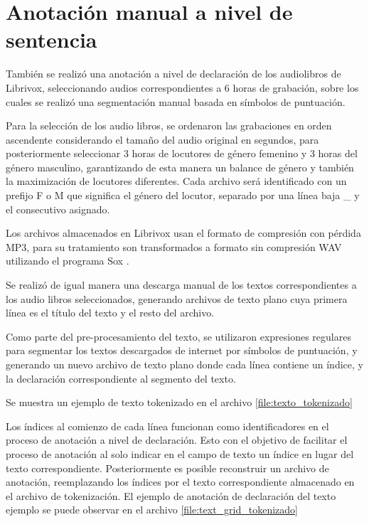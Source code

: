 \documentclass[a4paper,12pt,twoside]{report}
\begin{document}




\section{Anotación manual a nivel de sentencia}

También se realizó una anotación a nivel de declaración de los audiolibros de Librivox, seleccionando audios correspondientes a 6 horas de grabación, sobre los cuales se realizó una segmentación manual basada en símbolos de puntuación.

Para la selección de los audio libros, se ordenaron las grabaciones en orden ascendente considerando el tamaño del audio original en segundos, para posteriormente seleccionar 3 horas de locutores de género femenino y 3 horas del género masculino, garantizando de esta manera un balance de género y también la maximización de locutores diferentes. Cada archivo será identificado con un prefijo F o M que significa el género del locutor, separado por una línea baja \_ y el consecutivo asignado.

Los archivos almacenados en Librivox usan el formato de compresión con pérdida MP3, para su tratamiento son transformados a formato sin compresión WAV utilizando el programa Sox \cite{Sox}.

Se realizó de igual manera una descarga manual de los textos correspondientes a los audio libros seleccionados, generando archivos de texto plano cuya primera línea es el título del texto y el resto del archivo.

Como parte del pre-procesamiento del texto, se utilizaron expresiones regulares para segmentar los textos descargados de internet por símbolos de puntuación, y generando un nuevo archivo de texto plano donde cada línea contiene un índice, y la declaración correspondiente al segmento del texto.

Se muestra un ejemplo de texto tokenizado en el archivo \ref{file:texto_tokenizado}



Los índices al comienzo de cada línea funcionan como identificadores en el proceso de anotación a nivel de declaración. Esto con el objetivo de facilitar el proceso de anotación al solo indicar en el campo de texto un índice en lugar del texto correspondiente. Posteriormente es posible reconstruir un archivo de anotación, reemplazando los índices por el texto correspondiente almacenado en el archivo de tokenización. El ejemplo de anotación de declaración del texto ejemplo se puede observar en el archivo \ref{file:text_grid_tokenizado}
\end{document}
